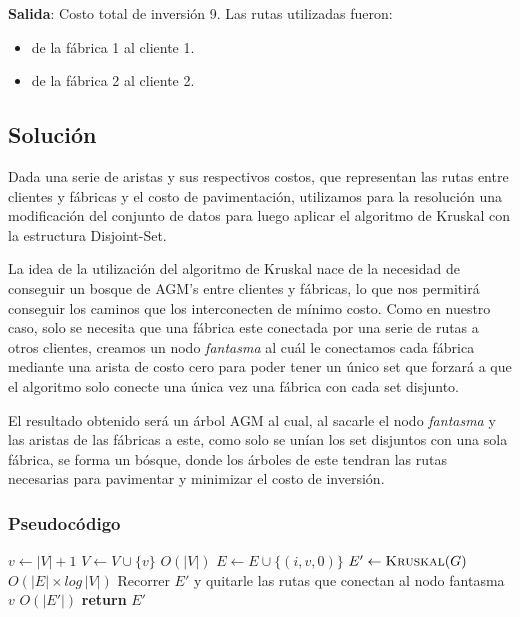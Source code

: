 \documentclass[a4paper, 10pt, twoside]{article}
\newenvironment{pseudo}[1][]{%
    \vspace{1em}%
    \begin{algorithmic}%
}
{%
    \end{algorithmic}%
    \vspace{1em}%
}
\newcommand{\To}{\textbf{to} }
\newcommand{\PReturn}{\State \textbf{return} }
\newcommand{\Ode}[1]{\hfill $O(#1)$}
\begin{document}
\textbf{Salida}: Costo total de inversión 9. Las rutas utilizadas fueron:
\begin{itemize}
\item{de la fábrica 1 al cliente 1.}
\item{de la fábrica 2 al cliente 2.}
\end{itemize}


\subsection{Solución}

Dada una serie de aristas y sus respectivos costos, que representan las rutas entre clientes y fábricas y el costo de pavimentación, utilizamos para la resolución una modificación del conjunto de datos para luego aplicar el algoritmo de Kruskal con la estructura Disjoint-Set.

La idea de la utilización del algoritmo de Kruskal nace de la necesidad de conseguir un bosque de AGM's entre clientes y fábricas, lo que nos permitirá conseguir los caminos que los interconecten de mínimo costo. Como en nuestro caso, solo se necesita que una fábrica este conectada por una serie de rutas a otros clientes, creamos un nodo \textit{fantasma} al cuál le conectamos cada fábrica mediante una arista de costo cero para poder tener un único set que forzará a que el algoritmo solo conecte una única vez una fábrica con cada set disjunto.

El resultado obtenido será un árbol AGM al cual, al sacarle el nodo \textit{fantasma} y las aristas de las fábricas a este, como solo se unían los set disjuntos con una sola fábrica, se forma un bósque, donde los árboles de este tendran las rutas necesarias para pavimentar y minimizar el costo de inversión.


\subsubsection{Pseudocódigo}

\begin{pseudo}
    \State $v \leftarrow |V| + 1$ 
    \State $V \leftarrow V \cup \{ v \}$ 
    \For{$i \leftarrow$ \To $f$}                                                         \Ode{|V|}
      \State $E \leftarrow E \cup \{ (i, v, 0)  \}$ 
    \EndFor
    \State $E' \leftarrow \textsc{Kruskal}(G)$                                           \Ode{|E| \times log\, |V|}
    \State Recorrer $E'$ y quitarle las rutas que conectan al nodo fantasma $v$          \Ode{|E'|}
    \PReturn $E'$
  \EndProcedure
\end{pseudo}
\end{document}

